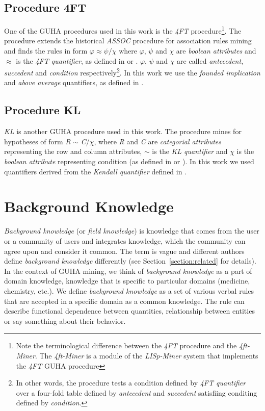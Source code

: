 \documentclass{llncs}
\begin{document}
\subsection{Procedure 4FT}
One of the GUHA procedures used in this work is the \emph{4FT}
procedure\footnote{Note the terminological difference between 
the \emph{4FT} procedure and the \emph{4ft-Miner}. The \emph{4ft-Miner}
is a module of the \emph{LISp-Miner} system that implements the
\emph{4FT} GUHA procedure}. The procedure extends the historical
\emph{ASSOC} procedure for association rules mining and finds the rules
in form $\varphi \approx \psi / \chi$ where $\varphi$, $\psi$ and $\chi$ 
are \emph{boolean attributes} and $\approx$ is the \emph{4FT quantifier},
as defined in \cite{Kuchar} or \cite{Approach}. $\varphi$, $\psi$ and
$\chi$ are called \emph{antecedent}, \emph{succedent} and \emph{condition}
respectively\footnote{In other words, the procedure tests a condition
defined by \emph{4FT quantifier} over a four-fold table defined by
\emph{antecedent} and \emph{succedent} satisfiing conditing defined by
\emph{condition}.}. In this work we use the \emph{founded implication}
and \emph{above average} quantifiers, as defined in \cite{Classes}.

\subsection{Procedure KL}
\label{section:kl}
\emph{KL} is another GUHA procedure used in this work. The procedure mines
for hypotheses of form \emph{R} $\sim$ \emph{C}/$\chi$, where \emph{R} and
\emph{C} are \emph{categorial attributes} representing the row and column
attributes, $\sim$ is the \emph{KL quantifier} and $\chi$ is the \emph{boolean
attribute} representing condition (as defined in \cite{Kuchar} or \cite{KL}).
In this work we used quantifiers derived from the \emph{Kendall quantifier}
defined in \cite{KLKvant}.

\section{Background Knowledge}
\label{section:backgroundknowledge}

\emph{Background knowledge} (or \emph{field knowledge}) is knowledge that
comes from the user or a community of users and integrates knowledge, which
the community can agree upon and consider it common. The term is vague and
different authors define \emph{background knowledge} differently (see 
Section~\ref{section:related} for details). In the context of GUHA mining,
we think of \emph{background knowledge} as a part of domain knowledge,
knowledge that is specific to particular domains (medicine, chemistry, etc.).
We define \emph{background knowledge} as a set of various verbal rules that
are accepted in a specific domain as a common knowledge. The rule can
describe functional dependence between quantities, relationship between entities
or say something about their behavior.
\end{document}

